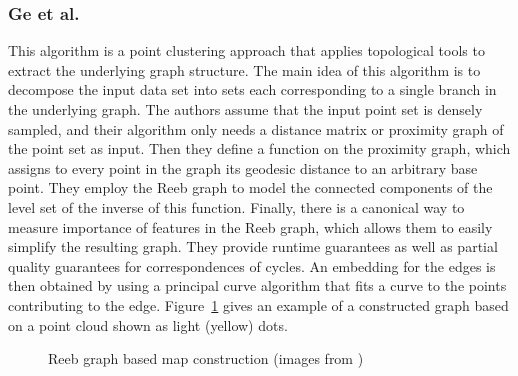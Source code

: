 \documentclass[natbib]{svjour3}                    \smartqed  \usepackage[table]{xcolor}
\begin{document}
 
\subsubsection{Ge et al. \protect\cite{DBLP:conf/nips/GeSBW11}}
\label{subsub:subsub_ge}
This algorithm is a point clustering approach that applies topological tools to extract the underlying graph structure. The main idea of this algorithm is to decompose the input data set into sets each corresponding to a single branch in the underlying graph. The authors assume that the input point set is densely sampled, and their algorithm only needs a distance matrix or proximity graph of the point set as input. 
Then they define a function on the proximity graph, which assigns to every point in the graph its geodesic distance to an arbitrary base point. They employ the Reeb graph to model the connected components of the level set of the inverse of this function.
Finally, there is a canonical way
to measure importance of features in the Reeb graph, which allows them to easily simplify the resulting graph.
They provide runtime guarantees as well as partial quality guarantees for correspondences of cycles. 
An embedding for the edges is then obtained by using a principal curve algorithm \cite{Kegl:2000:LDP:333666.333696} that fits a curve to the points contributing to the edge.
Figure~\ref{fig:ge} gives an example of a constructed graph based on a point cloud shown as light (yellow) dots. 

\begin{figure}[htbp]
 \begin{center}
 \end{center}
\caption{Reeb graph based map construction (images from \cite{DBLP:conf/nips/GeSBW11})}
\label{fig:ge}
\end{figure} 
\end{document}
